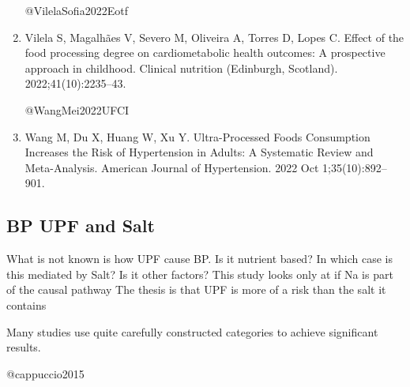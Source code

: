 \documentclass[
]{article}
\begin{document}
\begin{enumerate}
  @VilelaSofia2022Eotf
\item
  Vilela S, Magalhães V, Severo M, Oliveira A, Torres D, Lopes C. Effect
  of the food processing degree on cardiometabolic health outcomes: A
  prospective approach in childhood. Clinical nutrition (Edinburgh,
  Scotland). 2022;41(10):2235--43.

  @WangMei2022UFCI
\item
  Wang M, Du X, Huang W, Xu Y. Ultra-Processed Foods Consumption
  Increases the Risk of Hypertension in Adults: A Systematic Review and
  Meta-Analysis. American Journal of Hypertension. 2022 Oct
  1;35(10):892--901.
\end{enumerate}

\hypertarget{bp-upf-and-salt}{%
\subsection{BP UPF and Salt}\label{bp-upf-and-salt}}

What is not known is how UPF cause BP. Is it nutrient based? In which
case is this mediated by Salt? Is it other factors? This study looks
only at if Na is part of the causal pathway The thesis is that UPF is
more of a risk than the salt it contains

Many studies use quite carefully constructed categories to achieve
significant results.

@cappuccio2015
\end{document}
